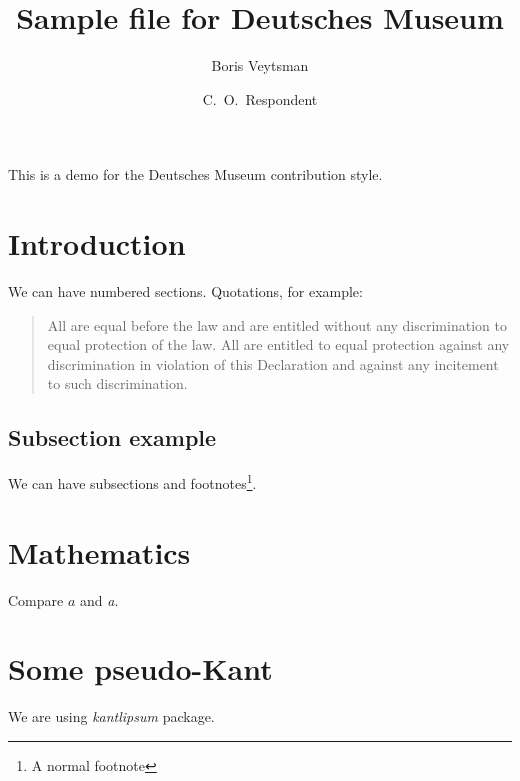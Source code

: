 \documentclass{deutschesmuseum}
\begin{document}
\title{Sample file for Deutsches Museum}
\author{Boris Veytsman \and C.~O.~Respondent}
\maketitle

This is a demo for the Deutsches Museum contribution style.

\section{Introduction}
\label{sec:intro}

We can have numbered sections.  Quotations, for
example\cite[][Article~7]{UNDeclaration}: 
\begin{quote}
  All are equal before the law and are entitled without any
  discrimination to equal protection of the law. All are entitled to
  equal protection against any discrimination in violation of this
  Declaration and against any incitement to such discrimination. 
\end{quote}

\subsection{Subsection example}
\label{sec:subsection}

We can have subsections and footnotes\footnote{A normal footnote}.

\section{Mathematics}
\label{sec:math}

Compare $a$ and \textit{a}.  

\section{Some pseudo-Kant}
\label{sec:kant}

We are using \textsl{kantlipsum} package\cite{kantlipsum}. 

\kant

\clearpage



\end{document}
